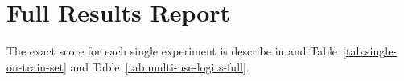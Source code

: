 \documentclass[11pt,a4paper]{article}
\begin{document}
\section{Full Results Report}
\label{apx:full-results-report}
The exact score for each single experiment is describe in and Table~\ref{tab:single-on-train-set} and Table~\ref{tab:multi-use-logits-full}.




\end{document}
